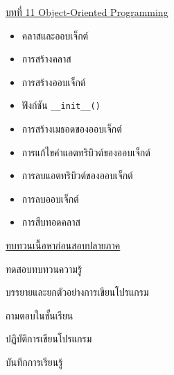 {
\underline{บทที่ 11 Object-Oriented Programming}
\begin{itemize}
\item คลาสและออบเจ็กต์
\item การสร้างคลาส
\item การสร้างออบเจ็กต์
\item ฟังก์ชัน \texttt{\_\_init\_\_()}
\item การสร้างเมธอดของออบเจ็กต์
\item การแก้ไขค่าแอตทริบิวต์ของออบเจ็กต์
\item การลบแอตทริบิวต์ของออบเจ็กต์
\item การลบออบเจ็กต์
\item การสืบทอดคลาส
\end{itemize}

\underline{ทบทวนเนื้อหาก่อนสอบปลายภาค}
}
{
\item ทดสอบทบทวนความรู้
\item  บรรยายและยกตัวอย่างการเขียนโปรแกรม
\item  ถามตอบในชั้นเรียน
\item  ปฏิบัติการเขียนโปรแกรม
\item  บันทึกการเรียนรู้
}